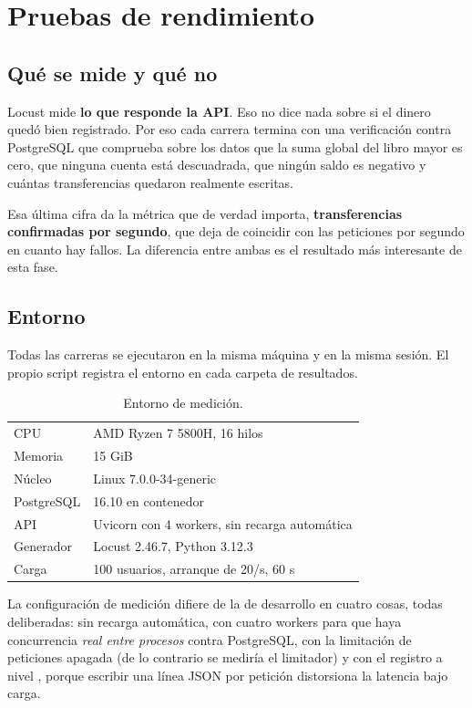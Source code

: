 \section{Pruebas de rendimiento}
\label{sec:rendimiento}

\subsection{Qué se mide y qué no}

Locust mide \textbf{lo que responde la API}. Eso no dice nada sobre si el
dinero quedó bien registrado. Por eso cada carrera termina con una
verificación contra PostgreSQL que comprueba sobre los datos que la suma
global del libro mayor es cero, que ninguna cuenta está descuadrada, que
ningún saldo es negativo y cuántas transferencias quedaron realmente
escritas.

Esa última cifra da la métrica que de verdad importa, \textbf{transferencias
confirmadas por segundo}, que deja de coincidir con las peticiones por segundo
en cuanto hay fallos. La diferencia entre ambas es el resultado más
interesante de esta fase.

\subsection{Entorno}

Todas las carreras se ejecutaron en la misma máquina y en la misma sesión. El
propio script registra el entorno en cada carpeta de resultados.

\begin{table}[htbp]
\centering
\caption{Entorno de medición.}
\label{tab:entorno}
\small
\begin{tabular}{@{}ll@{}}
\toprule
CPU & AMD Ryzen 7 5800H, 16 hilos \\
Memoria & 15 GiB \\
Núcleo & Linux 7.0.0-34-generic \\
PostgreSQL & 16.10 en contenedor \\
API & Uvicorn con 4 workers, sin recarga automática \\
Generador & Locust 2.46.7, Python 3.12.3 \\
Carga & 100 usuarios, arranque de 20/s, 60 s \\
\bottomrule
\end{tabular}
\end{table}

La configuración de medición difiere de la de desarrollo en cuatro cosas,
todas deliberadas: sin recarga automática, con cuatro workers para que haya
concurrencia \emph{real entre procesos} contra PostgreSQL, con la limitación
de peticiones apagada (de lo contrario se mediría el limitador) y con el
registro a nivel , porque escribir una línea JSON por petición
distorsiona la latencia bajo carga.

